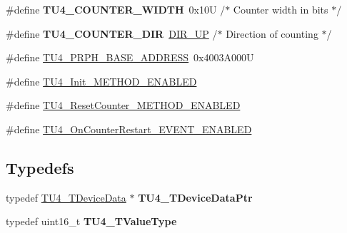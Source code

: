 \begin{DoxyCompactItemize}
\item 
\hypertarget{group___t_u4__module_ga692a7fa7347b70bff11e1c84850f7df6}{\#define {\bfseries T\-U4\-\_\-\-C\-O\-U\-N\-T\-E\-R\-\_\-\-W\-I\-D\-T\-H}~0x10\-U       /$\ast$ Counter width in bits  $\ast$/}\label{group___t_u4__module_ga692a7fa7347b70bff11e1c84850f7df6}

\item 
\hypertarget{group___t_u4__module_ga0f882beb809d02b55d3aa4d63999a1fa}{\#define {\bfseries T\-U4\-\_\-\-C\-O\-U\-N\-T\-E\-R\-\_\-\-D\-I\-R}~\hyperlink{group___p_e___types__module_gga89181fe4df1c4701239176768b4a9ce5a0b76fb863426c07c6c997a8d9523257b}{D\-I\-R\-\_\-\-U\-P}      /$\ast$ Direction of counting $\ast$/}\label{group___t_u4__module_ga0f882beb809d02b55d3aa4d63999a1fa}

\item 
\#define \hyperlink{group___t_u4__module_ga83504ba75347158bdc3516db85605487}{T\-U4\-\_\-\-P\-R\-P\-H\-\_\-\-B\-A\-S\-E\-\_\-\-A\-D\-D\-R\-E\-S\-S}~0x4003\-A000\-U
\item 
\#define \hyperlink{group___t_u4__module_ga0da8b2ca6f48e54a2d83c89df3e7025b}{T\-U4\-\_\-\-Init\-\_\-\-M\-E\-T\-H\-O\-D\-\_\-\-E\-N\-A\-B\-L\-E\-D}
\item 
\#define \hyperlink{group___t_u4__module_gacbdc9d6e479142ead61af0ba8e699254}{T\-U4\-\_\-\-Reset\-Counter\-\_\-\-M\-E\-T\-H\-O\-D\-\_\-\-E\-N\-A\-B\-L\-E\-D}
\item 
\#define \hyperlink{group___t_u4__module_gaaedc2595e0c6ddd8e434df14a7a13030}{T\-U4\-\_\-\-On\-Counter\-Restart\-\_\-\-E\-V\-E\-N\-T\-\_\-\-E\-N\-A\-B\-L\-E\-D}
\end{DoxyCompactItemize}
\subsection*{Typedefs}
\begin{DoxyCompactItemize}
\item 
\hypertarget{group___t_u4__module_gadf7d9c48ca22aaa9008d07de296dcfbd}{typedef \hyperlink{struct_t_u4___t_device_data}{T\-U4\-\_\-\-T\-Device\-Data} $\ast$ {\bfseries T\-U4\-\_\-\-T\-Device\-Data\-Ptr}}\label{group___t_u4__module_gadf7d9c48ca22aaa9008d07de296dcfbd}

\item 
\hypertarget{group___t_u4__module_gab9f4408c014e510934e2dfbbb03b509a}{typedef uint16\-\_\-t {\bfseries T\-U4\-\_\-\-T\-Value\-Type}}\label{group___t_u4__module_gab9f4408c014e510934e2dfbbb03b509a}

\end{DoxyCompactItemize}
